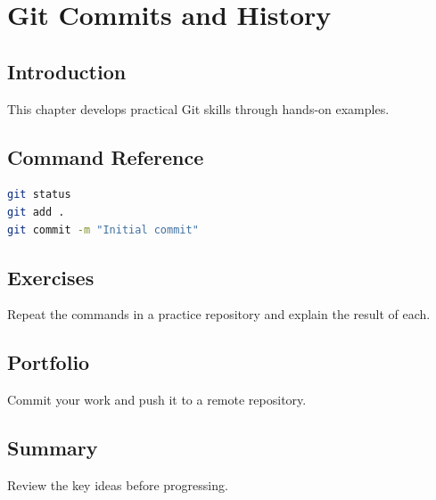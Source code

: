 \chapter{Git Commits and History}
\label{chap:vol2-6}



\section{Introduction}
This chapter develops practical Git skills through hands-on examples.

\section{Command Reference}
\begin{lstlisting}[language=bash]
git status
git add .
git commit -m "Initial commit"
\end{lstlisting}

\section{Exercises}
\begin{exercise}
Repeat the commands in a practice repository and explain the result of each.
\end{exercise}

\section{Portfolio}
Commit your work and push it to a remote repository.

\section{Summary}
Review the key ideas before progressing.
